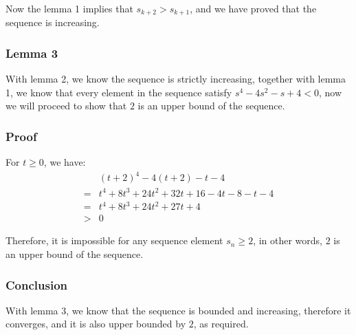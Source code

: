 Now the lemma 1 implies that $ s_{k+2} > s_{k+1} $, and we have proved that the sequence is increasing.

\subsubsection*{Lemma 3}
With lemma 2, we know the sequence is strictly increasing, together with lemma 1, we know that every element in the sequence satisfy $ s^4 - 4s^2 - s + 4 < 0 $, now we will proceed to show that $ 2 $ is an upper bound of the sequence.

\subsubsection*{Proof}

For $ t \ge 0 $, we have:
\begin{align*}
   & (t + 2)^4 - 4(t + 2) - t - 4 \\
  =& t^4 + 8t^3 + 24t^2 + 32t + 16 - 4t - 8 - t - 4 \\
  =& t^4 + 8t^3 + 24t^2 + 27t + 4 \\
  >& 0
\end{align*}

Therefore, it is impossible for any sequence element $ s_n \ge 2 $, in other words, $ 2 $ is an upper bound of the sequence.

\subsubsection*{Conclusion}
With lemma 3, we know that the sequence is bounded and increasing, therefore it converges, and it is also upper bounded by $ 2 $, as required.

